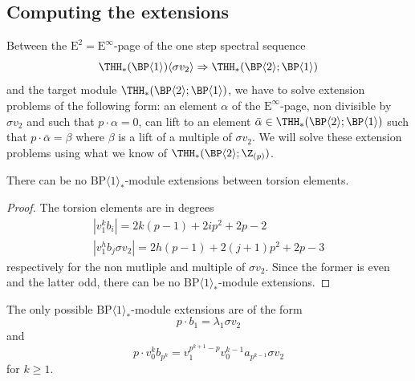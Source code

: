 
\subsection{Computing the extensions}\label{sec:extensions}

Between the $\mathrm{E}^2= \mathrm{E}^\infty$-page of the one step spectral sequence
\[
  \THH_*(\BP \langle 1 \rangle)\langle \sigma v_2 \rangle \Rightarrow \THH_*(\BP \langle 2 \rangle ; \BP \langle 1 \rangle)
\]
and the target module $\THH_*(\BP \langle 2 \rangle ; \BP \langle 1 \rangle)$, we have to solve extension problems of the following form: an element $\alpha$ of the $\mathrm{E}^\infty$-page, non divisible by $\sigma v_2$ and such that $p \cdot \alpha = 0$, can lift to an element $\bar{\alpha} \in \THH_*(\BP \langle 2 \rangle ; \BP \langle 1 \rangle)$ such that $p \cdot \bar{\alpha} = \beta$ where $\beta$ is a lift of a multiple of $\sigma v_2$. We will solve these extension problems using what we know of $\THH_*(\BP \langle 2 \rangle ; \Z_{(p)})$. 

\begin{lemma}\label{lem432}
  There can be no $\mathrm{BP}\langle 1\rangle_*$-module extensions between torsion elements.
\end{lemma}

\begin{proof}
  The torsion elements are in degrees
  \[
    \begin{gathered}
      |v_1^k b_i | = 2k(p-1) + 2i p^2 + 2p - 2 \\
      |v_1^h b_j \sigma v_2| = 2h(p-1) + 2(j+1)p^2 + 2p - 3
    \end{gathered}
  \]
  respectively for the non mutliple and multiple of $\sigma v_2$. Since the former is even and the latter odd, there can be no $\mathrm{BP}\langle 1\rangle_*$-module extensions.
\end{proof}


\begin{lemma} \label{lem:onlyextensions}
  The only possible $\mathrm{BP}\langle 1\rangle_*$-module extensions %
  are of the form
  \[
    p \cdot b_1 = \lambda_1 \sigma v_2
  \]
  and
  \[
    p \cdot v_0^k b_{p^k} = v_1^{p^{k+1} - p}v_0^{k-1} a_{p^{k-1}} \sigma v_2
  \]
  for $k \geq 1$.
\end{lemma}

